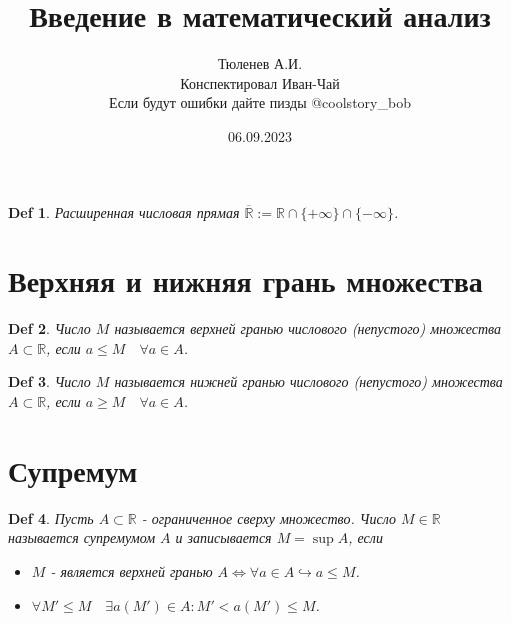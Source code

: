 \documentclass[a5paper, 10pt]{article}
\theoremstyle{plain}
\newtheorem{definition}{Def}
\newcommand{\R}{\mathbb R}
\newcommand{\hrarrow}{\hookrightarrow}
\newcommand{\Lrarrow}{\Leftrightarrow}
\begin{document}
    \author{
        Тюленев А.И.\\
        Конспектировал Иван-Чай\\
        Если будут ошибки дайте пизды @coolstory\_bob}
    \date{06.09.2023}
    \title{Введение в математический анализ}

    \linespread{1.4}
    \selectfont

    \maketitle
    \newpage

    \tableofcontents

    \begin{definition}
        Расширенная числовая прямая
        $ \overline{\R} := \R \cap \{+\infty\} \cap \{-\infty\} $.
    \end{definition}

    \section{Верхняя и нижняя грань множества}

    \begin{definition}
    Число $ M $ называется верхней гранью числового (непустого) множества $ A \subset \R $,
    если $ a \leq M \quad \forall a \in A $.
    \end{definition}

    \begin{definition}
    Число $ M $ называется нижней гранью числового (непустого) множества $ A \subset \R $,
    если $ a \geq M \quad \forall a \in A $.
    \end{definition}

    \section{Супремум}

    \begin{definition}
    Пусть $ A \subset \R $ - ограниченное сверху множество. Число $ M \in \R $ называется
    супремумом $ A $ и записывается $ M = \sup A $, если

    \begin{itemize}
        \item $ M $ - является верхней гранью $ A \Lrarrow \forall a \in A \hrarrow a \leq M $.
        \item $ \forall M' \leq M \quad \exists a(M') \in A : M' < a(M') \leq M $.
    \end{itemize}
    \end{definition}
\end{document}

